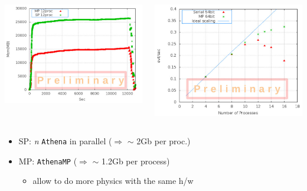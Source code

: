 \documentclass[9pt]{beamer}
\begin{document}
\begin{frame}
\begin{columns}
\begin{column}{0.6\textwidth}

\includegraphics[width=.9\linewidth]{figs/athenamp-mem-savings.pdf}
\end{column}
\begin{column}{0.5\textwidth}

\includegraphics[width=.9\linewidth]{figs/athenamp-throughput-savings.pdf}
\end{column}
\end{columns}

\begin{itemize}
\item SP: \emph{n} \texttt{Athena} in parallel ($\Rightarrow$ $\sim$ 2Gb per proc.)
\item MP: \texttt{AthenaMP} ($\Rightarrow$ $\sim$ 1.2Gb per process)
\begin{itemize}
\item \alert{allow to do more physics with the same h/w}
\end{itemize}
\end{itemize}
\end{frame}
\end{document}
